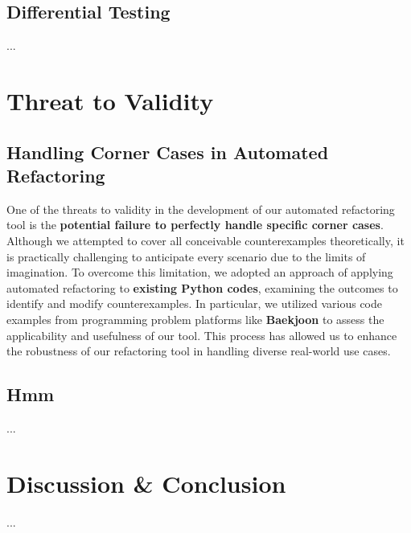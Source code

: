 \documentclass[11pt]{article}
\begin{document}
\subsection{Differential Testing}
...\\

\section{Threat to Validity}
\subsection{Handling Corner Cases in Automated Refactoring}
One of the threats to validity in the development of our automated refactoring tool is the \textbf{potential failure to perfectly handle specific corner cases}. Although we attempted to cover all conceivable counterexamples theoretically, it is practically challenging to anticipate every scenario due to the limits of imagination. To overcome this limitation, we adopted an approach of applying automated refactoring to \textbf{existing Python codes}, examining the outcomes to identify and modify counterexamples. In particular, we utilized various code examples from programming problem platforms like \textbf{Baekjoon} to assess the applicability and usefulness of our tool. This process has allowed us to enhance the robustness of our refactoring tool in handling diverse real-world use cases.\\

\subsection{Hmm}
...\\

\section{Discussion \& Conclusion}
...\\
\end{document}
